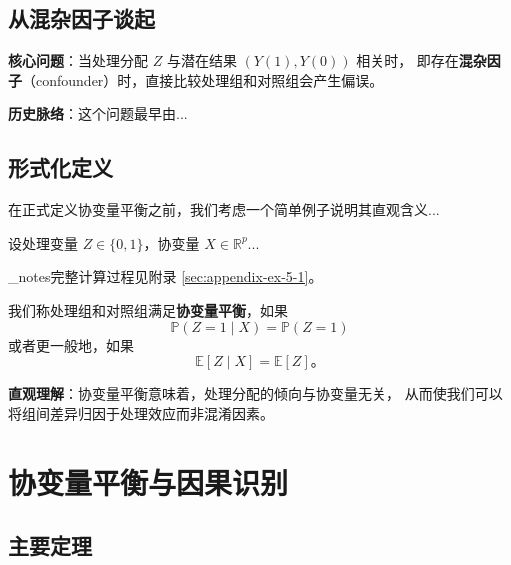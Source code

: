\begin{refsection}
\subsection{从混杂因子谈起}\label{sec:5-1-1}

\textbf{核心问题}：当处理分配 $Z$ 与潜在结果 $(Y(1), Y(0))$ 相关时，
即存在\textbf{混杂因子}（confounder）时，直接比较处理组和对照组会产生偏误。

\textbf{历史脉络}：这个问题最早由...


\subsection{形式化定义}\label{sec:5-1-2}

在正式定义协变量平衡之前，我们考虑一个简单例子说明其直观含义...

\begin{Example}[二元处理的协变量平衡]\label{ex:5-1}
设处理变量 $Z \in \{0, 1\}$，协变量 $X \in \mathbb{R}^p$...
\end{Example}
\par\_notes{完整计算过程见附录 \cref{sec:appendix-ex-5-1}。}

\begin{Definition}[5.1 — 协变量平衡]\label{def:5-1}
我们称处理组和对照组满足\textbf{协变量平衡}，如果
\begin{equation}\label{eq:5-1-balance}
\mathbb{P}(Z=1 \mid X) = \mathbb{P}(Z=1)
\end{equation}
或者更一般地，如果
\begin{equation}\label{eq:5-1-balance-general}
\mathbb{E}[Z \mid X] = \mathbb{E}[Z]。
\end{equation}
\end{Definition}

\textbf{直观理解}：协变量平衡意味着，处理分配的倾向与协变量无关，
从而使我们可以将组间差异归因于处理效应而非混淆因素。


\section{协变量平衡与因果识别}\label{sec:5-2}

\subsection{主要定理}\label{sec:5-2-1}


\end{refsection}

